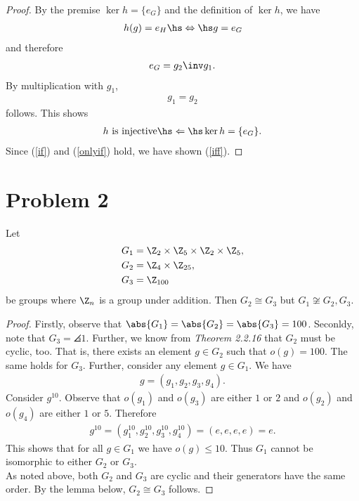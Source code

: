 \documentclass{article}
\begin{document}
\begin{proof}
	By the premise $\ker h = \{e_G\}$ and the definition of $\ker h$,
	we have
	\begin{align*}
		h(g) = e_H \hs\Leftrightarrow\hs g=e_G
	\end{align*}
	and therefore
	\begin{align*}
		e_G = g_2\inv g_1.
	\end{align*}
	By multiplication with $g_1$,
	\begin{align*}
		g_1 = g_2
	\end{align*}
	follows. This shows
	\begin{align}
		\label{onlyif}
		h\text{ is injective}\hs\Leftarrow\hs \ker h = \{e_G\}.
	\end{align}
	Since (\ref{if}) and (\ref{onlyif}) hold, we have shown (\ref{iff}).
\end{proof}

\section*{Problem 2}


\begin{claim*}
	Let
	\begin{align*}
		G_1 & = \Z_2 \times \Z_5 \times \Z_2 \times \Z_5, \\
		G_2 & = \Z_4 \times \Z_{25},                      \\
		G_3 & = \Z_{100}
	\end{align*}
	be groups where $\Z_n$ is a group under addition. Then
	$G_2 \cong G_3$ but $G_1\not\cong G_2,G_3$.
\end{claim*}

\begin{proof}
	Firstly, observe that $\abs{G_1}=\abs{G_2}=\abs{G_3}=100$.
	Seconldy, note that $G_3=\angles{1}$. Further, we know from
	\emph{Theorem 2.2.16} that $G_2$ must be cyclic, too. That is,
	there exists an element $g\in G_2$ such that $o(g)=100$. The
	same holds for $G_3$. Further, consider any element $g\in G_1$.
	We have
	\begin{align*}
		g = (g_1, g_2, g_3, g_4).
	\end{align*}
	Consider $g^{10}$. Observe that $o(g_1)$ and $o(g_3)$ are either
	$1$ or $2$ and $o(g_2)$ and $o(g_4)$ are either $1$ or $5$. Therefore
	\begin{align*}
		g^{10}=(g_1^{10},g_2^{10},g_3^{10},g_4^{10})=(e,e,e,e)=e.
	\end{align*}
	This shows that for all $g\in G_1$ we have $o(g)\leq 10$. Thus
	$G_1$ cannot be isomorphic to either $G_2$ or $G_3$.\\
	\indent As noted above, both $G_2$ and $G_3$ are cyclic and their
	generators have the same order. By the lemma below, $G_2\cong G_3$
	follows.
\end{proof}
\end{document}
